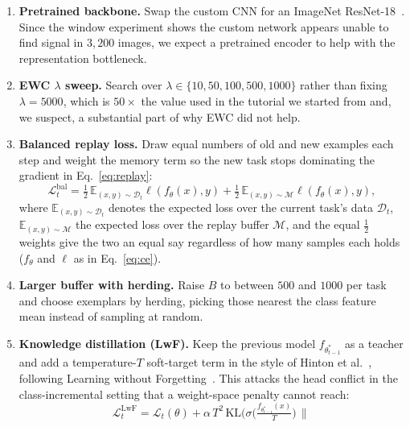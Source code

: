 \documentclass[11pt]{article}
\newcommand{\E}{\mathbb{E}}
\begin{document}
\begin{enumerate}[leftmargin=1.7em,topsep=2pt,itemsep=3pt]
  \item \textbf{Pretrained backbone.} Swap the custom CNN for an ImageNet
        ResNet-18~\cite{he2016resnet}. Since the window experiment shows the
        custom network appears unable to find signal in $3{,}200$ images, we
        expect a pretrained encoder to help with the representation bottleneck.
  \item \textbf{EWC $\lambda$ sweep.} Search over
        $\lambda\in\{10,50,100,500,1000\}$ rather than fixing $\lambda{=}5000$,
        which is $50\times$ the value used in the tutorial we started from and,
        we suspect, a substantial part of why EWC did not help.
  \item \textbf{Balanced replay loss.} Draw equal numbers of old and new
        examples each step and weight the memory term so the new task stops
        dominating the gradient in Eq.~\eqref{eq:replay}:
        \begin{equation}
        \mathcal{L}^{\text{bal}}_t=\tfrac{1}{2}\,
        \E_{(x,y)\sim\mathcal{D}_t}\ell(f_\theta(x),y)
        +\tfrac{1}{2}\,\E_{(x,y)\sim\mathcal{M}}\ell(f_\theta(x),y),
        \label{eq:balreplay}
        \end{equation}
        where $\E_{(x,y)\sim\mathcal{D}_t}$ denotes the expected loss over the
        current task's data $\mathcal{D}_t$, $\E_{(x,y)\sim\mathcal{M}}$ the
        expected loss over the replay buffer $\mathcal{M}$, and the equal
        $\tfrac{1}{2}$ weights give the two an equal say regardless of how many
        samples each holds ($f_\theta$ and $\ell$ as in Eq.~\eqref{eq:ce}).
  \item \textbf{Larger buffer with herding.} Raise $B$ to between $500$ and
        $1000$ per task and choose exemplars by herding, picking those nearest
        the class feature mean instead of sampling at random.
  \item \textbf{Knowledge distillation (LwF).} Keep the previous model
        $f_{\theta^{*}_{t-1}}$ as a teacher and add a temperature-$T$ soft-target
        term in the style of Hinton et al.~\cite{hinton2015distill}, following
        Learning without Forgetting~\cite{li2017lwf}. This attacks the head
        conflict in the class-incremental setting that a weight-space penalty
        cannot reach:
        \begin{equation}
        \mathcal{L}^{\text{LwF}}_t=\mathcal{L}_t(\theta)
        +\alpha\,T^2\,\mathrm{KL}\!\Big(
        \sigma\!\big(\tfrac{f_{\theta^{*}_{t-1}}(x)}{T}\big)\,\Big\|\,

\end{equation}
\end{enumerate}
\end{document}
